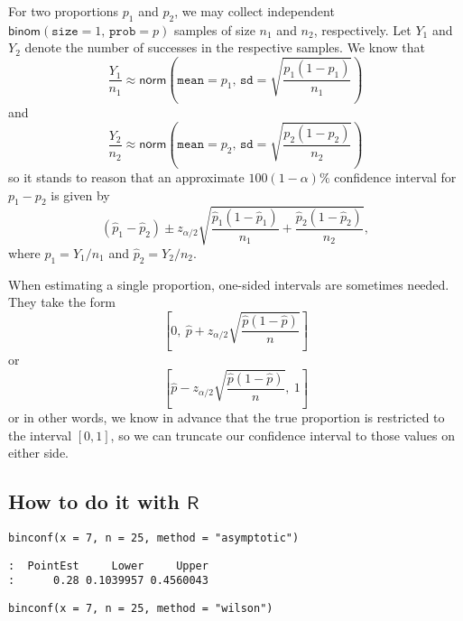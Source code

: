 For two proportions \(p_{1}\) and \(p_{2}\), we may collect
independent \(\mathsf{binom}(\mathtt{size}=1,\,\mathtt{prob}=p)\)
samples of size \(n_{1}\) and \(n_{2}\), respectively. Let \(Y_{1}\)
and \(Y_{2}\) denote the number of successes in the respective
samples.  We know that \[
\frac{Y_{1}}{n_{1}}\approx\mathsf{norm}\left(\mathtt{mean}=p_{1},\,\mathtt{sd}=\sqrt{\frac{p_{1}(1-p_{1})}{n_{1}}}\right)
\] and \[
\frac{Y_{2}}{n_{2}}\approx\mathsf{norm}\left(\mathtt{mean}=p_{2},\,\mathtt{sd}=\sqrt{\frac{p_{2}(1-p_{2})}{n_{2}}}\right)
\] so it stands to reason that an approximate \(100(1-\alpha)\%\)
confidence interval for \(p_{1}-p_{2}\) is given by
\begin{equation}
\left(\hat{p}_{1}-\hat{p}_{2}\right)\pm z_{\alpha/2}\sqrt{\frac{\hat{p}_{1}(1-\hat{p}_{1})}{n_{1}}+\frac{\hat{p}_{2}(1-\hat{p}_{2})}{n_{2}}},
\end{equation}
where \(\hat{p}_{1}=Y_{1}/n_{1}\) and \(\hat{p}_{2}=Y_{2}/n_{2}\).

\begin{rem}
When estimating a single proportion, one-sided intervals are sometimes
needed. They take the form
\begin{equation}
\left[0,\ \hat{p}+z_{\alpha/2}\sqrt{\frac{\hat{p}(1-\hat{p})}{n}}\right]
\end{equation}
or
\begin{equation}
\left[\hat{p}-z_{\alpha/2}\sqrt{\frac{\hat{p}(1-\hat{p})}{n}},\ 1\right]
\end{equation}
or in other words, we know in advance that the true proportion is
restricted to the interval \([0,1]\), so we can truncate our
confidence interval to those values on either side.
\end{rem}

\subsection{How to do it with \(\mathsf{R}\)}
\label{sec-9-4-1}

\begin{verbatim}
binconf(x = 7, n = 25, method = "asymptotic")
\end{verbatim}

\begin{verbatim}
:  PointEst     Lower     Upper
:      0.28 0.1039957 0.4560043
\end{verbatim}

\begin{verbatim}
binconf(x = 7, n = 25, method = "wilson")
\end{verbatim}

